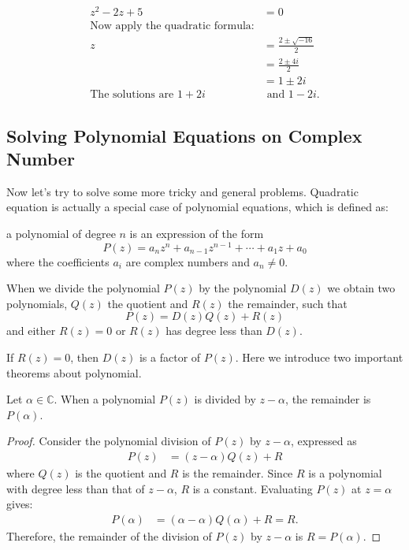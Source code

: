 \documentclass[
	12pt, %
	fleqn, %
	a4paper, %
]{LegrandOrangeBook}
\begin{document}
$$\begin{aligned}
    z^2 - 2z + 5 &= 0 \\
    \text{Now apply the quadratic formula:} \\
    z &= \frac{2 \pm \sqrt{-16}}{2} \\
    &= \frac{2 \pm 4i}{2} \\
    &= 1 \pm 2i \\
    \text{The solutions are } 1 + 2i &\text{ and } 1 - 2i.
\end{aligned}$$

\subsection{Solving Polynomial Equations on Complex Number}
Now let's try to solve some more tricky and general problems. Quadratic equation is actually a special case of
polynomial equations, which is defined as:
\begin{definition}
    a polynomial of degree $n$ is an expression of the form 
    $$P(z)=a_nz^n+a_{n-1}z^{n-1}+\cdots+a_1z+a_0$$
    where the coefficients $a_i$ are complex numbers and $a_n \neq 0$.
\end{definition}
When we divide the polynomial \( P(z) \) by the polynomial \( D(z) \) we obtain two polynomials, \( Q(z) \) the quotient and \( R(z) \) the remainder, such that
\[
P(z) = D(z)Q(z) + R(z)
\]
and either \( R(z) = 0 \) or \( R(z) \) has degree less than \( D(z) \).

If \( R(z) = 0 \), then \( D(z) \) is a factor of \( P(z) \).
Here we introduce two important theorems about polynomial.
\begin{theorem}
    Let \(\alpha \in \mathbb{C}\). When a polynomial \(P(z)\) is divided by \(z - \alpha\), the remainder is \(P(\alpha)\).
\end{theorem}
\begin{proof}
    Consider the polynomial division of \( P(z) \) by \( z - \alpha \), expressed as
    \begin{equation}
    \begin{aligned}
        P(z) &= (z - \alpha)Q(z) + R
    \end{aligned}
    \end{equation}
    where \( Q(z) \) is the quotient and \( R \) is the remainder. Since \( R \) is a polynomial with degree less than that of \( z - \alpha \), \( R \) is a constant. Evaluating \( P(z) \) at \( z = \alpha \) gives:
    \begin{equation}
    \begin{aligned}
        P(\alpha) &= (\alpha - \alpha)Q(\alpha) + R = R.
    \end{aligned}
    \end{equation}
    Therefore, the remainder of the division of \( P(z) \) by \( z - \alpha \) is \( R = P(\alpha) \).
    \end{proof}
\end{document}

